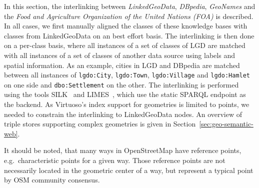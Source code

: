 In this section, the interlinking between \emph{LinkedGeoData},
\emph{DBpedia}, \emph{GeoNames} and the
\emph{Food and Agriculture Organization of the United Nations (FOA)} is
described.
In all cases, we first manually aligned the classes of these
knowledge bases with classes from LinkedGeoData on an best effort basis.
The interlinking is then done on a per-class basis, where all instances of a set
of classes of LGD are matched with all instances of a set of classes of another data source using labels and spatial information. As an example, cities in LGD
and DBpedia are matched between all instances of \nolinkurl{lgdo:City}, \nolinkurl{lgdo:Town}, \nolinkurl{lgdo:Village} and
\nolinkurl{lgdo:Hamlet} on one side and \nolinkurl{dbo:Settlement} on the other.
The interlinking is performed using the tools SILK~\cite{silk} and
LIMES~\cite{limes}, which use the static SPARQL endpoint as the backend. As
Virtuoso's index support for geometries is limited to points, we needed to constrain the interlinking to
LinkedGeoData nodes. An overview of triple stores supporting complex
geometries is given in Section~\ref{sec:geo-semantic-web}.

It should be noted, that many ways in OpenStreetMap have reference
points, e.g.~characteristic points for a given way. Those reference points
are not necessarily located in the geometric center of a way, but represent
a typical point by OSM community consensus.

